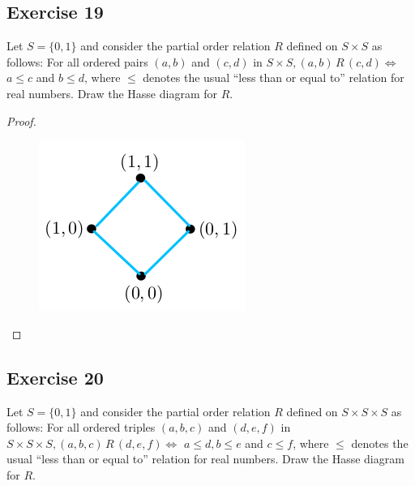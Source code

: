 \documentclass[14pt]{extarticle}
\begin{document}
\subsection{Exercise 19}
Let \(S = \{0, 1\}\) and consider the partial order relation $R$ defined on \(S \times S\) as follows: For all
ordered pairs \((a, b)\) and \((c, d)\) in \(S \times S, (a, b) \,R\, (c, d) \iff\) \(a \leq c\) and \(b \leq d\),
where \(\leq\) denotes the usual “less than or equal to” relation for real numbers. Draw the Hasse diagram for $R$.

\begin{proof}
        \begin{figure}[ht!]
                \centering
                \includegraphics[scale=0.4]{../images/8.5.19.png}
        \end{figure}
\end{proof}

\subsection{Exercise 20}
Let \(S = \{0, 1\}\) and consider the partial order relation $R$ defined on \(S \times S \times S\) as follows:
For all ordered triples \((a, b, c)\) and \((d, e, f)\) in \(S \times S \times S, (a, b, c) \,R\, (d, e, f) \iff\)
\(a \leq d, b \leq e\) and \(c \leq f\), where \(\leq\) denotes the usual “less than or equal to” relation for real
numbers. Draw the Hasse diagram for $R$.
\end{document}
